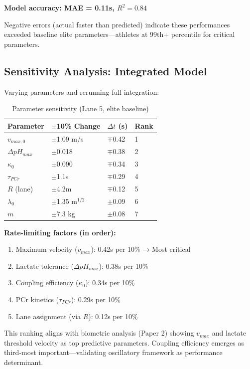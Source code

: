 \textbf{Model accuracy: MAE = 0.11s, $R^2 = 0.84$}

Negative errors (actual faster than predicted) indicate these performances exceeded baseline elite parameters—athletes at 99th+ percentile for critical parameters.

\subsection{Sensitivity Analysis: Integrated Model}

Varying parameters and rerunning full integration:

\begin{table}[H]
\centering
\caption{Parameter sensitivity (Lane 5, elite baseline)}
\begin{tabular}{@{}llll@{}}
\toprule
\textbf{Parameter} & \textbf{$\pm$10\% Change} & \textbf{$\Delta t$ (s)} & \textbf{Rank} \\
\midrule
$v_{max,0}$ & $\pm$1.09 m/s & $\mp$0.42 & 1 \\
$\Delta pH_{max}$ & $\pm$0.018 & $\mp$0.38 & 2 \\
$\kappa_0$ & $\pm$0.090 & $\mp$0.34 & 3 \\
$\tau_{PCr}$ & $\pm$1.1s & $\mp$0.29 & 4 \\
$R$ (lane) & $\pm$4.2m & $\mp$0.12 & 5 \\
$\lambda_0$ & $\pm$1.35 m$^{1/2}$ & $\pm$0.09 & 6 \\
$m$ & $\pm$7.3 kg & $\pm$0.08 & 7 \\
\bottomrule
\end{tabular}
\end{table}

\textbf{Rate-limiting factors (in order):}
\begin{enumerate}
    \item Maximum velocity ($v_{max}$): 0.42s per 10\% → Most critical
    \item Lactate tolerance ($\Delta pH_{max}$): 0.38s per 10\%
    \item Coupling efficiency ($\kappa_0$): 0.34s per 10\%
    \item PCr kinetics ($\tau_{PCr}$): 0.29s per 10\%
    \item Lane assignment (via $R$): 0.12s per 10\%
\end{enumerate}

This ranking aligns with biometric analysis (Paper 2) showing $v_{max}$ and lactate threshold velocity as top predictive parameters. Coupling efficiency emerges as third-most important—validating oscillatory framework as performance determinant.

